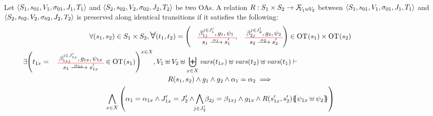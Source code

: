 \documentclass[runningheads]{llncs}
\begin{document}


\begin{definition}\label{def:preservation} \\
Let \(\OAg[1]\) and \(\OAg[2]\) be two OAs.
A relation \(R: S_1 \times S_2 \to \rformulas[V_1 \uplus V_2]\) between  \(\OAg[1]\) and \(\OAg[2]\)
  is preserved along identical transitions if  it satisfies the following:
\begin{multline*}
\forall \mpar{s_1, s_2} \in S_1 \times S_2, \bigsymb{\forall} \mpar{t_1, t_2} = \mpar{\OTx{1}{}{1}{1}, \OTx{2}{}{2}{2}} \in \fOT{s_1} \times \fOT{s_2} \\ 
\exists 
\mpar{t_{1x} = \OTx{1}{x}{1x}{1x} \in \fOT{s_1}}^{x \in X},
 V_1 \uplus V_2 \uplus \biguplus_{x\in X}\fvars{t_{1x}} \uplus \fvars{t_2} \uplus \fvars{t_1} \vdash \hspace{6cm}\\  R\mpar{s_1, s_2} \wedge 	g_1 \wedge g_2 \wedge \alpha_1 = \alpha_2 
\implies \\
\bigwedge_{x\in X}
\mpar{
\alpha_1=\alpha_{1 x}  \land J'_{1x}= J'_2 \land \bigwedge_\subbox{j \in J'_2 } \beta_{2j} = \beta_{1xj}\land g_{1 x}\land
 R\mpar{s'_{1 x}, s'_2}\psubst{\psi_{1 x} \uplus \psi_2}}\\
\end{multline*}
\end{definition}
\end{document}
